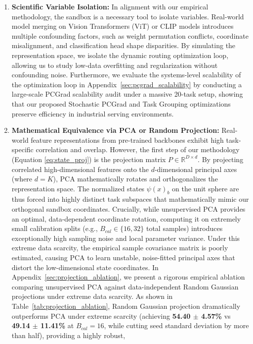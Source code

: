 \begin{enumerate}
  \item \textbf{Scientific Variable Isolation:} In alignment with our empirical methodology, the
sandbox is a necessary tool to isolate variables. Real-world model merging on Vision Transformers
(ViT) or CLIP models introduces multiple confounding factors, such as weight permutation conflicts,
coordinate misalignment, and classification head shape disparities. By simulating the representation
space, we isolate the dynamic routing optimization loop, allowing us to study low-data overfitting
and regularization without confounding noise. Furthermore, we evaluate the systems-level scalability
of the optimization loop in Appendix~\ref{sec:pcgrad_scalability} by conducting a large-scale PCGrad
scalability audit under a massive 20-task setup, showing that our proposed Stochastic PCGrad and
Task Grouping optimizations preserve efficiency in industrial serving environments.
  \item \textbf{Mathematical Equivalence via PCA or Random Projection:} Real-world feature
representations from pre-trained backbones exhibit high task-specific correlation and overlap.
However, the first step of our methodology (Equation \ref{eq:state_proj}) is the projection matrix
$P \in \mathbb{R}^{D \times d}$. By projecting correlated high-dimensional features onto the
$d$-dimensional principal axes (where $d = K$), PCA mathematically rotates and orthogonalizes the
representation space. The normalized states $\psi(x)_b$ on the unit sphere are thus forced into
highly distinct task subspaces that mathematically mimic our orthogonal sandbox coordinates.
Crucially, while unsupervised PCA provides an optimal, data-dependent coordinate rotation, computing
it on extremely small calibration splits (e.g., $B_{cal} \in \{16, 32\}$ total samples) introduces
exceptionally high sampling noise and local parameter variance. Under this extreme data scarcity,
the empirical sample covariance matrix is poorly estimated, causing PCA to learn unstable,
noise-fitted principal axes that distort the low-dimensional state coordinates. In
Appendix~\ref{sec:projection_ablation}, we present a rigorous empirical ablation comparing
unsupervised PCA against data-independent Random Gaussian projections under extreme data scarcity.
As shown in Table~\ref{tab:projection_ablation}, Random Gaussian projection dramatically outperforms
PCA under extreme scarcity (achieving \textbf{54.40 $\pm$ 4.57\%} vs \textbf{49.14 $\pm$ 11.41\%} at
$B_{cal}=16$, while cutting seed standard deviation by more than half), providing a highly robust,

\end{enumerate}
